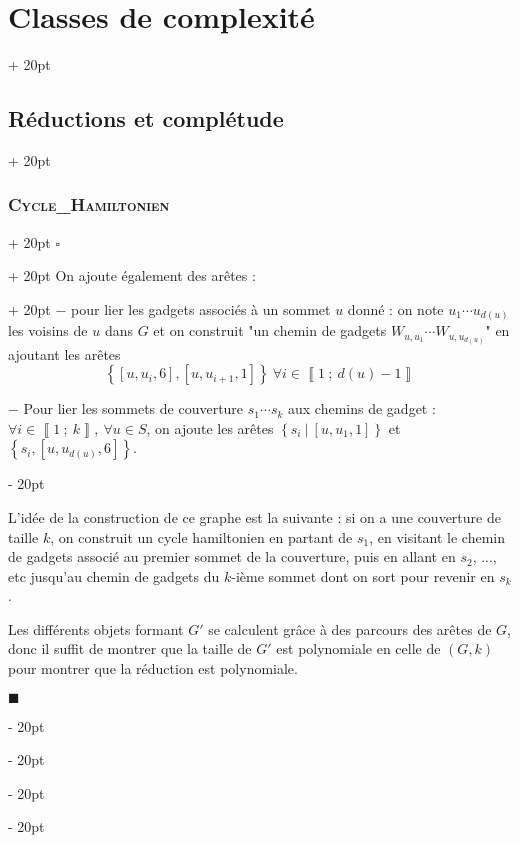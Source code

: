 \documentclass[a4paper, 12pt, twoside]{article}
\newcommand{\nset}[2]{\left\llbracket #1\ ;\ #2 \right\rrbracket}
\newcommand{\set}[1]{\left\{ #1 \right\}}
\newcommand{\ind}[1][20pt]{\advance\leftskip + #1}
\newcommand{\deind}[1][20pt]{\advance\leftskip - #1}
\newenvironment{indt}[2][20pt]{#2 \par \ind[#1]}{\par \deind} %
\newenvironment{proof}[1][{}]{\begin{indt}{$\square$ #1}}{$\blacksquare$ \end{indt}}
\begin{document}
\begin{indt}{\section{Classes de complexité}}
\begin{indt}{\subsection{Réductions et complétude}}
\begin{indt}{\subsubsection{\textsc{Cycle\_Hamiltonien}}}
\begin{proof}
                    \begin{indt}{On ajoute également des arêtes :}
                        $-$ pour lier les gadgets associés à un sommet $u$ donné : on note $u_1 \cdots u_{d(u)}$ les voisins de $u$ dans $G$ et on construit "un chemin de gadgets $W_{u, u_1} \cdots W_{u, u_{d(u)}}$" en ajoutant les arêtes
                        \[
                            \set{[u, u_i, 6], [u, u_{i + 1}, 1]}\ \forall i \in \nset{1}{d(u) - 1}
                        \]

                        \begin{center}
                        \end{center}

                        $-$ Pour lier les sommets de couverture $s_1 \cdots s_k$ aux chemins de gadget : $\forall i \in \nset 1 k,\ \forall u \in S$, on ajoute les arêtes $\set{s_i\ |\ [u, u_1, 1]}$ et $\set{s_i, [u, u_{d(u)}, 6]}$.
                    \end{indt}

                    L'idée de la construction de ce graphe est la suivante : si on a une couverture de taille $k$, on construit un cycle hamiltonien en partant de $s_1$, en visitant le chemin de gadgets associé au premier sommet de la couverture, puis en allant en $s_2$, ..., etc jusqu'au chemin de gadgets du $k$-ième sommet dont on sort pour revenir en $s_k$.

                    Les différents objets formant $G'$ se calculent grâce à des parcours des arêtes de $G$, donc il suffit de montrer que la taille de $G'$ est polynomiale en celle de $(G, k)$ pour montrer que la réduction est polynomiale.


\end{proof}
\end{indt}
\end{indt}
\end{indt}
\end{document}
